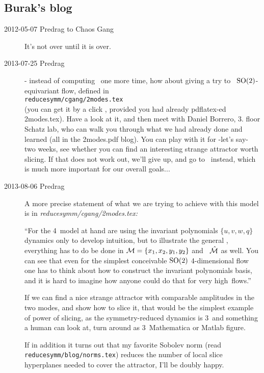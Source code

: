 \subsection{Burak's {\twoMode} blog}
\label{chap:2modesBBblog}

\begin{description}
\item[2012-05-07  Predrag to Chaos Gang] It's not over until it is over.

\item[2013-07-25  Predrag]
 - instead of computing \cLf\ one more
time, how about giving a try to \twoMode\ $\textrm{SO}(2)$-equivariant flow,
defined in
\\
\texttt{reducesymm/cgang/2modes.tex}
\\ (you can get it by a click
, provided you had already pdflatex-ed
2modes.tex). Have a look at it, and then meet with Daniel Borrero, 3. floor
Schatz lab, who can walk you through what we had already done and learned
(all in the 2modes.pdf blog). You can play with it for -let's say- two
weeks, see whether you can find an interesting strange attractor worth
slicing. If that does not work out, we'll give up, and go to \KS\ instead,
which is much more important for our overall goals...

\item[2013-08-06 Predrag]
A more precise statement of what we are trying to achieve with this model is
in \emph{reducesymm/cgang/2modes.tex:}

``For the 4\dmn\ model at hand are using the invariant polynomials
$\{u,v,w,q\}$ dynamics only to develop intuition, but to illustrate the
general \mslices, everything has to do be done in ${\cal M} =
\{x_1,x_2,y_1,y_2\}$ and \slice\ $\hat{\cal M}$ as well. You can see that even
for the simplest conceivable $\textrm{SO}(2)$ 4-dimensional flow one has to
think about how to construct the invariant polynomials basis, and it is
hard to imagine how anyone could do that for very high\dmn\ flows.''

If we can find a nice strange attractor with comparable amplitudes in the
two modes, and show how to slice it, that would be the simplest example of
power of slicing, as the symmetry-reduced dynamics is 3\dmn\ and something
a human can look at, turn around as 3\dmn\ Mathematica or Matlab figure.

If in addition it turns out that my favorite Sobolev norm (read
\texttt{reducesymm/blog/norms.tex}) reduces the number of local slice
hyperplanes needed to cover the attractor, I'll be doubly happy.


\end{description}
